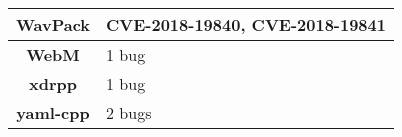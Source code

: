 \begin{table}[h]
\begin{tabular}{|c|l|}
\textbf{WavPack}        & CVE-2018-19840, CVE-2018-19841                                                                                                                                                                     \\ \hline
\textbf{WebM}           & 1 bug                                                                                                                                                                                              \\ \hline
\textbf{xdrpp}          & 1 bug                                                                                                                                                                                              \\ \hline
\textbf{yaml-cpp}       & 2 bugs                                                                                                                                                                                             \\ \hline
\end{tabular}
\end{table}